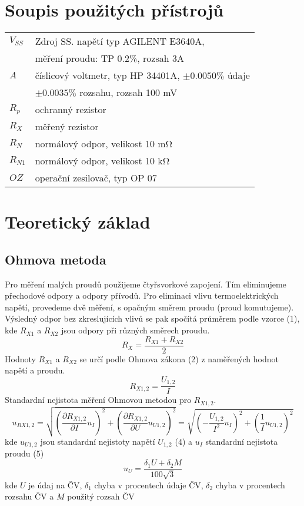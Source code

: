 \documentclass{article}
\begin{document}
\section{Soupis použitých přístrojů}
\begin{tabular}{ll}
	$V_{SS}$ & Zdroj SS. napětí typ AGILENT E3640A,\\ & měření proudu: TP 0.2\%, rozsah 3\si{\ampere} \\
	$A$ & číslicový voltmetr, typ HP 34401A, $\pm 0.0050 \%$ údaje\\ & $\pm 0.0035 \%$ rozsahu, rozsah 100 \si{\milli\volt}\\
	$R_p$ & ochranný rezistor \\
	$R_X$ & měřený rezistor \\
	$R_N$ & normálový odpor, velikost 10 \si{\milli\ohm} \\
	$R_{N1}$ & normálový odpor, velikost 10 \si{\kilo\ohm} \\
	$OZ$ & operační zesilovač, typ OP 07 \\
\end{tabular}

\section{Teoretický základ}
\subsection{Ohmova metoda}
Pro měření malých proudů použijeme čtyřsvorkové zapojení. Tím eliminujeme přechodové odpory a odpory přívodů. Pro eliminaci vlivu termoelektrických napětí, provedeme dvě měření, s opačným směrem proudu (proud komutujeme). Výsledný odpor bez zkreslujících vlivů se pak spočítá průměrem podle vzorce (1), kde $R_{X1}$ a $R_{X2}$ jsou odpory při různých směrech proudu.
\begin{equation}
	R_X = \frac{R_{X1} + R_{X2}}{2}
\end{equation}
Hodnoty $R_{X1}$ a $R_{X2}$ se určí podle Ohmova zákona (2) z naměřených hodnot napětí a proudu.
\begin{equation}
	R_{X1,2} = \frac{U_{1,2}}{I}
\end{equation}
Standardní nejistota měření Ohmovou metodou pro $R_{X1,2}$.
\begin{equation}
	u_{RX1,2}=\sqrt{(\frac{\partial R_{X1,2}}{\partial I}u_I)^2+(\frac{\partial R_{X1,2}}{\partial U}u_{U1,2})^2}=\sqrt{(-\frac{U_{1,2}}{I^2}u_I)^2+(\frac{1}{I}u_{U1,2})^2}
\end{equation}
kde $u_{U1,2}$ jsou standardní nejistoty napětí $U_{1,2}$ (4) a $u_I$ standardní nejistota proudu (5)
\begin{equation}
	u_U = \frac{\delta_1U+\delta_2M}{100\sqrt{3}}
\end{equation}
kde $U$ je údaj na ČV,
$\delta_1$ chyba v procentech údaje ČV,
$\delta_2$ chyba v procentech rozsahu ČV a
$M$ použitý rozsah ČV
\end{document}
